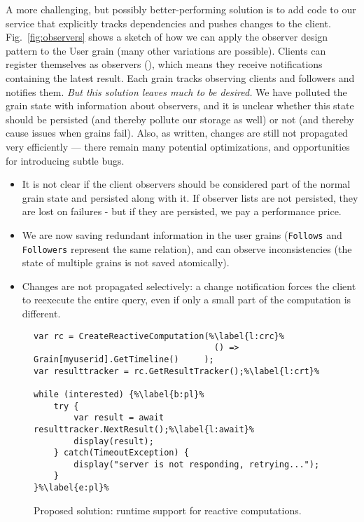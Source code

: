 A more challenging, but possibly better-performing solution is to add code to our service that explicitly tracks dependencies and pushes changes to the client. Fig.~\ref{fig:observers} shows a sketch of how we can apply the observer design pattern to the User grain (many other variations are possible). Clients can register themselves as observers (), which means they receive notifications containing the latest result. Each grain  tracks observing clients and followers and notifies them. \emph{But this solution leaves much to be desired. } We have polluted the grain state with information about observers, and it is unclear whether this state should be persisted (and thereby pollute our storage as well) or not (and thereby cause issues when grains fail). Also, as written, changes are still not propagated very efficiently --- there remain many potential optimizations, and opportunities for introducing subtle bugs. 

\hidden
{\begin{itemize}
\item It is not clear if the client observers should be considered part of the normal grain state and persisted along with it. If observer lists are not persisted, they are lost on failures - but if they are persisted, we pay a performance price.
\item We are now saving redundant information in the user grains (\lstinline{Follows} and \lstinline{Followers} represent the same relation), and can observe inconsistencies  (the state of multiple grains is not saved atomically).  
\item Changes are not propagated selectively: a change notification forces the client to reexecute the entire query, even if only a small part of the computation is different.
\end{itemize}
}



\begin{figure}
\begin{lstlisting}
var rc = CreateReactiveComputation(%\label{l:crc}%
									() => Grain[myuserid].GetTimeline()   	);
var resulttracker = rc.GetResultTracker();%\label{l:crt}%

while (interested) {%\label{b:pl}%
	try {
		var result = await resulttracker.NextResult();%\label{l:await}%
		display(result);
	} catch(TimeoutException) { 
		display("server is not responding, retrying...");
	}
}%\label{e:pl}%
\end{lstlisting}
\caption{Proposed solution: runtime support for reactive computations.}\label{fig:rcapi}
\end{figure}


